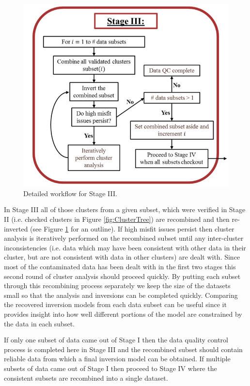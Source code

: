 \documentclass[final,authoryear,5p,times,twocolumn]{elsarticle}
\begin{document}
\begin{figure} [!ht]
\begin{center}
   \includegraphics[trim=0cm 0cm 0cm 0cm, clip=true,width=0.8\linewidth]{./Figures/Fig15.png}
\end{center}
\caption{Detailed workflow for Stage III.}
\label{fig:DataQC_workflow_StageIII}
\end{figure}

In Stage III all of those clusters from a given subset, which were verified in Stage II (i.e. checked clusters in Figure \ref{fig:ClusterTree}) are recombined and then re-inverted (see Figure \ref{fig:DataQC_workflow_StageIII} for an outline). If high misfit issues persist then cluster analysis is iteratively performed on the recombined subset until any inter-cluster inconsistencies (i.e. data which may have been consistent with other data in their cluster, but are not consistent with data in other clusters) are dealt with. Since most of the contaminated data has been dealt with in the first two stages this second round of cluster analysis should proceed quickly. By putting each subset through this recombining process separately we keep the size of the datasets small so that the analysis and inversions can be completed quickly. Comparing the recovered inversion models from each data subset can be useful since it provides insight into how well different portions of the model are constrained by the data in each subset.

If only one subset of data came out of Stage I then the data quality control process is completed here in Stage III and the recombined subset should contain reliable data from which a final inversion model can be obtained. If multiple subsets of data came out of Stage I then proceed to Stage IV where the consistent subsets are recombined into a single dataset.
\end{document}

